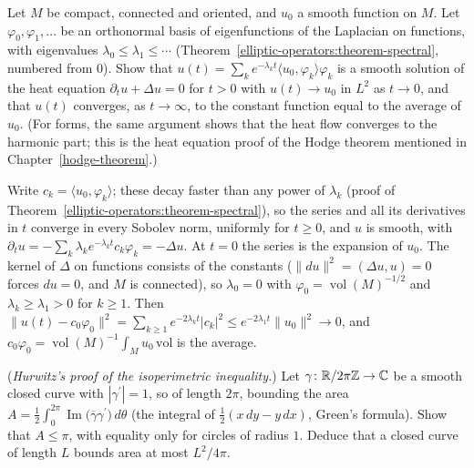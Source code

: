 \begin{exercise}\label{elliptic-operators:exercise-heat-equation}
Let $M$ be compact, connected and oriented, and $u_0$ a smooth function on $M$. Let $\varphi_0, \varphi_1, \ldots$ be an orthonormal basis of eigenfunctions of the Laplacian on functions, with
eigenvalues $\lambda_0 \leq \lambda_1 \leq \cdots$ (Theorem~\ref{elliptic-operators:theorem-spectral}, numbered from $0$). Show that $u(t) = \sum_ke^{-\lambda_kt}\langle u_0, \varphi_k\rangle\varphi_k$ is a smooth solution of the heat equation $\partial_tu + \Delta u = 0$ for $t > 0$ with $u(t) \to u_0$ in $L^2$ as $t \to 0$, and that $u(t)$ converges, as
$t \to \infty$, to the constant function equal to the average of $u_0$. (For forms, the same argument shows that the heat flow converges to the harmonic part; this is the heat equation proof of the
Hodge theorem mentioned in Chapter~\ref{hodge-theorem}.)
\end{exercise}

\begin{solution}
Write $c_k = \langle u_0, \varphi_k\rangle$; these decay faster than any power of $\lambda_k$ (proof of Theorem~\ref{elliptic-operators:theorem-spectral}), so the series and all its derivatives in $t$ converge in every
Sobolev norm, uniformly for $t \geq 0$, and $u$ is smooth, with $\partial_tu = -\sum_k\lambda_ke^{-\lambda_kt}c_k\varphi_k = -\Delta u$. At $t = 0$ the series is the expansion of $u_0$. The kernel of $\Delta$ on functions
consists of the constants ($\|du\|^2 = (\Delta u, u) = 0$ forces $du = 0$, and $M$ is connected), so $\lambda_0 = 0$ with $\varphi_0 = \operatorname{vol}(M)^{-1/2}$ and $\lambda_k \geq \lambda_1 > 0$ for $k \geq 1$. Then
$\|u(t) - c_0\varphi_0\|^2 = \sum_{k \geq 1}e^{-2\lambda_kt}|c_k|^2 \leq e^{-2\lambda_1t}\|u_0\|^2 \to 0$, and $c_0\varphi_0 = \operatorname{vol}(M)^{-1}\int_Mu_0\,\mathrm{vol}$ is the average.
\end{solution}

\begin{exercise}\label{elliptic-operators:exercise-isoperimetric}
(\emph{Hurwitz's proof of the isoperimetric inequality.}) Let $\gamma \colon \mathbb{R}/2\pi\mathbb{Z} \to \mathbb{C}$ be a smooth closed curve with $|\gamma^{\prime}| = 1$, so of length $2\pi$, bounding the area
$A = \frac12\int_0^{2\pi}\operatorname{Im}\bigl(\overline{\gamma}\gamma^{\prime}\bigr)\,d\theta$ (the integral of $\frac12(x\,dy - y\,dx)$, Green's formula). Show that $A \leq \pi$, with equality only for circles of radius
$1$. Deduce that a closed curve of length $L$ bounds area at most $L^2/4\pi$.
\end{exercise}

